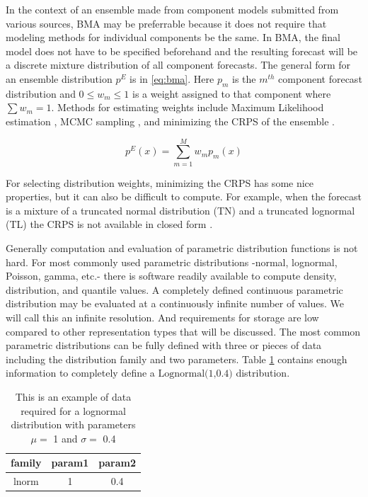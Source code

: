 \documentclass[11pt,notitlepage]{isuthesis}
\begin{document}
In the context of an ensemble made from component models submitted from various
sources,
BMA may be preferrable because it does not require that modeling methods for 
individual components be the same. 
In BMA, the final model does not have to be specified
beforehand and the resulting forecast will be a discrete mixture distribution
of all component forecasts. The general form for an ensemble distribution $p^E$
is in \eqref{eq:bma}. Here $p_m$ is the $m^{th}$ component forecast 
distribution and 
$0 \leq w_m \leq 1$ is a weight assigned to that component where $\sum w_m = 1$.
Methods for estimating weights include Maximum Likelihood estimation
\cite{raftery2005using}, MCMC 
sampling \cite{vrugt2008ensemble},
and minimizing the CRPS of the ensemble
\cite{baran2018combining}.

\begin{equation}
\label{eq:bma}
  p^E(x) = \sum_{m=1}^M w_mp_m(x)
\end{equation}


For selecting distribution weights, minimizing the CRPS has some nice 
properties, but it can also be
difficult to compute. For example, when the forecast is a mixture of a 
truncated normal distribution (TN) and a truncated lognormal (TL) the CRPS is 
not available in closed form \cite{baran2018combining}.

Generally computation and evaluation of parametric distribution functions is not 
hard. 
For most commonly used parametric distributions -normal, lognormal, Poisson,
gamma, etc.- there is software readily available to compute density, 
distribution, and quantile values. 
A completely defined continuous parametric distribution may be evaluated at a
continuously
infinite number of values. We will call this an infinite resolution.
And requirements for storage are low 
compared to other representation types that will be discussed. The most common
parametric distributions can be fully defined with three or pieces of data
including
the distribution family and two parameters. Table \ref{table:pstor} 
contains
enough information to completely define a $\mbox{Lognormal(1,0.4)}$ 
distribution.

\begin{table}[h!]
\begin{center}
\begin{minipage}{10cm}
\captionsetup{font=scriptsize}
\centering
 \begin{tabular}{|c c c|} 
 \hline
 family & param1 & param2 \\ [0.5ex] 
 \hline
 lnorm & 1 & 0.4 \\ 
 \hline
 \end{tabular}
 \caption[Parametric distribution storage]{This is an example of data required
 for a lognormal 
 distribution with 
 parameters $\mu = $ 1 and $\sigma =$ 0.4}
 \label{table:pstor}
 \end{minipage}
 \end{center}
\end{table}
\end{document}
